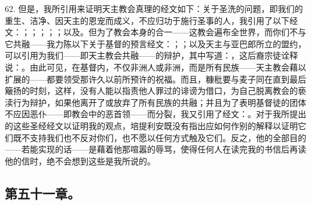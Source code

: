 62. 但是，我所引用来证明天主教会真理的经文如下：关于圣洗的问题，即我们的重生、洁净、因天主的恩宠而成义，不应归功于施行圣事的人，我引用了以下经文：；；；；；以及。但为了教会本身的合一——这教会遍布全世界，而你们不与它共融——我力陈以下关于基督的预言经文：；；以及天主与亚巴郎所立的盟约，可以引用为我们——即天主教会共融——的辩护，其中写道：，这后裔宗徒诠释说：。由此可见，在基督内，不仅非洲人或非洲，而是所有民族——天主教会藉以扩展的——都要领受那许久以前所预许的祝福。而且，糠秕要与麦子同在直到最后簸扬的时刻，这样，没有人能以指责他人罪过的诽谤为借口，为自己脱离教会的亵渎行为辩护，如果他离开了或放弃了所有民族的共融；并且为了表明基督徒的团体不应因恶仆——即教会中的恶首领——而分裂，我又引用了经文：。对于我所提出的这些圣经经文以证明我的观点，培提利安既没有指出应如何作别的解释以证明它们既不支持我们也不反对你们，也不愿以任何方式触及它们。反之，他的全部目的——若能实现的话——是藉着他那喧嚣的辱骂，使得任何人在读完我的书信后再读他的信时，绝不会想到这些是我所说的。\par


\subsection{第五十一章。}

